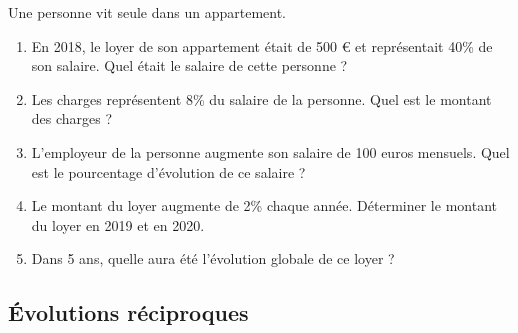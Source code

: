 {\begin{Exercice}
Une personne vit seule dans un appartement.
\begin{enumerate}
\item En 2018, le loyer de son appartement était de 500 € et représentait 40\% de son salaire.
Quel était le salaire de cette personne ?
\item Les charges représentent 8\% du salaire de la personne. Quel est le montant des charges ?
\item L'employeur de la personne augmente son salaire de 100 euros mensuels. Quel est le pourcentage d'évolution de ce salaire ?
\item Le montant du loyer augmente de 2\% chaque année. Déterminer le montant du loyer en
2019 et en 2020.
\item Dans 5 ans, quelle aura été l'évolution globale de ce loyer ?
\end{enumerate}
\end{Exercice}



\subsection*{Évolutions réciproques}

}
